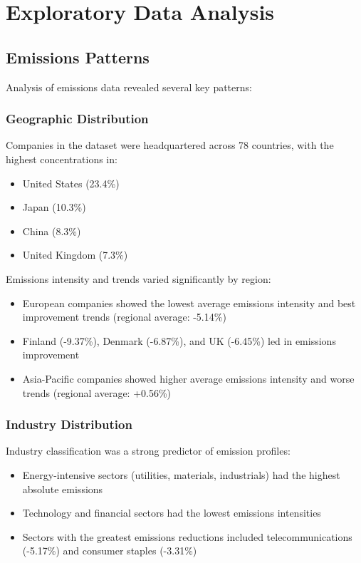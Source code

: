 \documentclass[11pt,a4paper]{article}
\begin{document}
\section{Exploratory Data Analysis}

\subsection{Emissions Patterns}
Analysis of emissions data revealed several key patterns:

\subsubsection{Geographic Distribution}
Companies in the dataset were headquartered across 78 countries, with the highest concentrations in:
\begin{itemize}
    \item United States (23.4\%)
    \item Japan (10.3\%)
    \item China (8.3\%)
    \item United Kingdom (7.3\%)
\end{itemize}

Emissions intensity and trends varied significantly by region:
\begin{itemize}
    \item European companies showed the lowest average emissions intensity and best improvement trends (regional average: -5.14\%)
    \item Finland (-9.37\%), Denmark (-6.87\%), and UK (-6.45\%) led in emissions improvement
    \item Asia-Pacific companies showed higher average emissions intensity and worse trends (regional average: +0.56\%)
\end{itemize}

\subsubsection{Industry Distribution}
Industry classification was a strong predictor of emission profiles:
\begin{itemize}
    \item Energy-intensive sectors (utilities, materials, industrials) had the highest absolute emissions
    \item Technology and financial sectors had the lowest emissions intensities
    \item Sectors with the greatest emissions reductions included telecommunications (-5.17\%) and consumer staples (-3.31\%)
\end{itemize}
\end{document}
